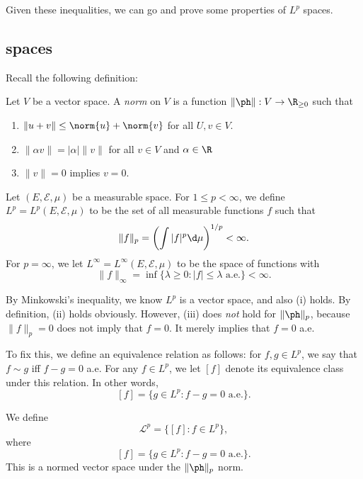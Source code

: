 \documentclass[a4paper]{article}
\begin{document}
Given these inequalities, we can go and prove some properties of $L^p$ spaces.

\subsection{ spaces}
Recall the following definition:

\begin{defi}
  Let $V$ be a vector space. A \emph{norm} on $V$ is a function $\|\ph\|: V \to \R_{\geq 0}$ such that
  \begin{enumerate}
    \item $\|u + v\| \leq \norm{u} + \norm{v}$ for all $U, v \in V$.
    \item $\|\alpha v\| = |\alpha|\|v\|$ for all $v \in V$ and $\alpha \in \R$
    \item $\|v\| = 0$ implies $v = 0$.
  \end{enumerate}
\end{defi}

\begin{defi}[$L^p$ spaces]
  Let $(E, \mathcal{E}, \mu)$ be a measurable space. For $1 \leq p < \infty$, we define $L^p = L^p(E, \mathcal{E}, \mu)$ to be the set of all measurable functions $f$ such that
  \[
    \|f\|_p = \left(\int |f|^p \d \mu\right)^{1/p} < \infty.
  \]
  For $p = \infty$, we let $L^\infty = L^\infty(E, \mathcal{E}, \mu)$ to be the space of functions with
  \[
    \|f\|_{\infty} = \inf \{\lambda \geq 0: |f| \leq \lambda \text{ a.e.}\} < \infty.
  \]
\end{defi}

By Minkowski's inequality, we know $L^p$ is a vector space, and also (i) holds. By definition, (ii) holds obviously. However, (iii) does \emph{not} hold for $\|\ph\|_p$, because $\|f\|_p = 0$ does not imply that $f = 0$. It merely implies that $f = 0$ a.e.

To fix this, we define an equivalence relation as follows: for $f, g \in L^p$, we say that $f \sim g$ iff $f - g = 0$ a.e. For any $f \in L^p$, we let $[f]$ denote its equivalence class under this relation. In other words,
\[
  [f] = \{g \in L^p: f - g = 0\text{ a.e.}\}.
\]
\begin{defi}
  We define
  \[
    \mathcal{L}^p = \{[f]: f \in L^p\},
  \]
  where
  \[
    [f] = \{g \in L^p: f - g = 0\text{ a.e.}\}.
  \]
  This is a normed vector space under the $\|\ph\|_p$ norm.
\end{defi}
\end{document}
